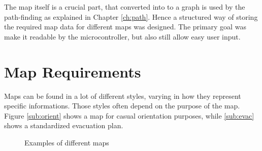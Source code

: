 The map itself is a crucial part, that converted into to a graph is used by the path-finding as explained in Chapter \ref{ch:path}. Hence a structured way of storing the required map data for different maps was designed. The primary goal was make it readable by the microcontroller, but also still allow easy user input.


\newpage
\section{Map Requirements}
\label{sec:map_requirements}
Maps can be found in a lot of different styles,
varying in how they represent specific informations.
Those styles often depend on the purpose of the map.
Figure \ref{sub:orient} shows a map for casual orientation purposes,
while \ref{sub:evac} shows a standardized evacuation plan.

\begin{figure}[h!tp]
    \centering
    \hspace{0.1\textwidth}
    \caption{Examples of different maps}
    \label{fig:floor_plans}
\end{figure}

